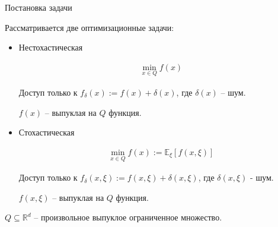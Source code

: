 \documentclass{beamer}
\begin{document}
\begin{frame}{Постановка задачи}

    Рассматривается две оптимизационные задачи:\\

    \begin{itemize}
        \item Нестохастическая
                
            \begin{align*}
                \min_{x \in Q} f(x)
            \end{align*}

            Доступ только к $f_{\delta}(x) := f(x) + \delta(x)$, где $\delta(x)$ -- шум.

            $f(x)$ -- выпуклая на $Q$ функция.

        \item Стохастическая
        
            \begin{align*}
                \min_{x \in Q} f(x) :=  \mathbb{E}_{\xi} \left[ f(x, \xi) \right]
            \end{align*}

                
            Доступ только к $f_{\delta}(x, \xi) := f(x, \xi) + \delta(x, \xi)$, где $\delta(x, \xi)$ - шум.

            $f(x, \xi)$ -- выпуклая на $Q$ функция.

    \end{itemize}

        $Q \subseteq \mathbb{R}^d$ -- произвольное выпуклое ограниченное множество.
   
\end{frame}

\end{document}
